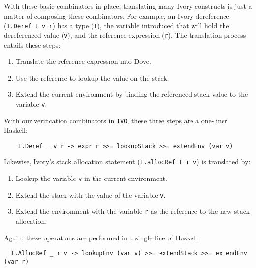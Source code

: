 \documentclass{article}
\begin{document}
With these basic combinators in place, translating many Ivory
constructs is just a matter of composing these combinators.
For example, an Ivory dereference (\texttt{I.Deref t v r})
has a type (\texttt{t}), the variable introduced that
will hold the dereferenced value (\texttt{v}), and
the reference expression (\texttt{r}).  The translation
process entails these steps:

\begin{enumerate}
  \item Translate the reference expression into Dove.
  \item Use the reference to lookup the value on the stack.
  \item Extend the current environment by binding the referenced
        stack value to the variable \texttt{v}.
\end{enumerate}

With our verification combinators in \texttt{IVO}, these
three steps are a one-liner Haskell:

\begin{lstlisting}
    I.Deref _ v r -> expr r >>= lookupStack >>= extendEnv (var v)
\end{lstlisting}

Likewise, Ivory's stack allocation statement (\texttt{I.allocRef t r v})
is translated by:

\begin{enumerate}
  \item Lookup the variable \texttt{v} in the current environment.
  \item Extend the stack with the value of the variable \texttt{v}.
  \item Extend the environment with the variable \texttt{r} as the reference to the new stack allocation.
\end{enumerate}

Again, these operations are performed in a single line of Haskell:

\begin{lstlisting}
  I.AllocRef _ r v -> lookupEnv (var v) >>= extendStack >>= extendEnv (var r)
\end{lstlisting}
\end{document}
